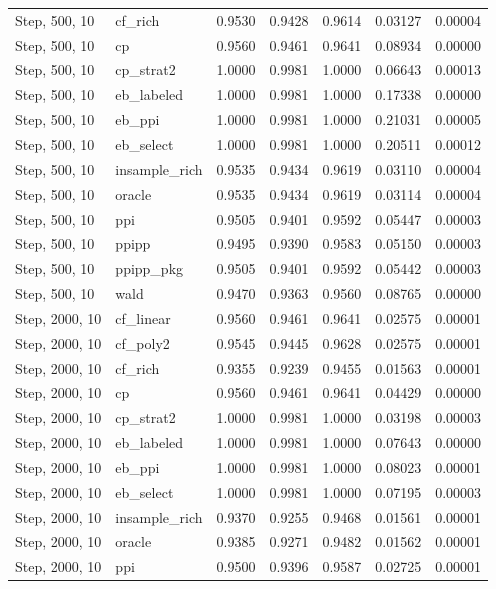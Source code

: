 \begin{longtable}{llrrrrr}
Step, 500, 10 & cf\_rich & 0.9530 & 0.9428 & 0.9614 & 0.03127 & 0.00004 \\
Step, 500, 10 & cp & 0.9560 & 0.9461 & 0.9641 & 0.08934 & 0.00000 \\
Step, 500, 10 & cp\_strat2 & 1.0000 & 0.9981 & 1.0000 & 0.06643 & 0.00013 \\
Step, 500, 10 & eb\_labeled & 1.0000 & 0.9981 & 1.0000 & 0.17338 & 0.00000 \\
Step, 500, 10 & eb\_ppi & 1.0000 & 0.9981 & 1.0000 & 0.21031 & 0.00005 \\
Step, 500, 10 & eb\_select & 1.0000 & 0.9981 & 1.0000 & 0.20511 & 0.00012 \\
Step, 500, 10 & insample\_rich & 0.9535 & 0.9434 & 0.9619 & 0.03110 & 0.00004 \\
Step, 500, 10 & oracle & 0.9535 & 0.9434 & 0.9619 & 0.03114 & 0.00004 \\
Step, 500, 10 & ppi & 0.9505 & 0.9401 & 0.9592 & 0.05447 & 0.00003 \\
Step, 500, 10 & ppipp & 0.9495 & 0.9390 & 0.9583 & 0.05150 & 0.00003 \\
Step, 500, 10 & ppipp\_pkg & 0.9505 & 0.9401 & 0.9592 & 0.05442 & 0.00003 \\
Step, 500, 10 & wald & 0.9470 & 0.9363 & 0.9560 & 0.08765 & 0.00000 \\
Step, 2000, 10 & cf\_linear & 0.9560 & 0.9461 & 0.9641 & 0.02575 & 0.00001 \\
Step, 2000, 10 & cf\_poly2 & 0.9545 & 0.9445 & 0.9628 & 0.02575 & 0.00001 \\
Step, 2000, 10 & cf\_rich & 0.9355 & 0.9239 & 0.9455 & 0.01563 & 0.00001 \\
Step, 2000, 10 & cp & 0.9560 & 0.9461 & 0.9641 & 0.04429 & 0.00000 \\
Step, 2000, 10 & cp\_strat2 & 1.0000 & 0.9981 & 1.0000 & 0.03198 & 0.00003 \\
Step, 2000, 10 & eb\_labeled & 1.0000 & 0.9981 & 1.0000 & 0.07643 & 0.00000 \\
Step, 2000, 10 & eb\_ppi & 1.0000 & 0.9981 & 1.0000 & 0.08023 & 0.00001 \\
Step, 2000, 10 & eb\_select & 1.0000 & 0.9981 & 1.0000 & 0.07195 & 0.00003 \\
Step, 2000, 10 & insample\_rich & 0.9370 & 0.9255 & 0.9468 & 0.01561 & 0.00001 \\
Step, 2000, 10 & oracle & 0.9385 & 0.9271 & 0.9482 & 0.01562 & 0.00001 \\
Step, 2000, 10 & ppi & 0.9500 & 0.9396 & 0.9587 & 0.02725 & 0.00001 \\

\end{longtable}
